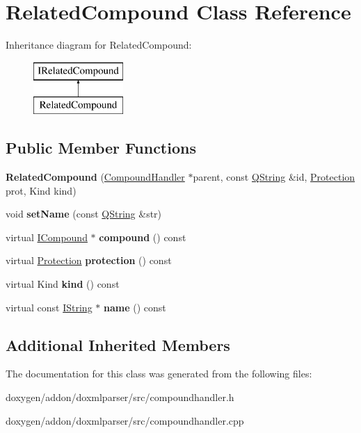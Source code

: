 \hypertarget{class_related_compound}{}\section{Related\+Compound Class Reference}
\label{class_related_compound}
Inheritance diagram for Related\+Compound\+:\begin{figure}[H]
\begin{center}
\leavevmode
\includegraphics[height=2.000000cm]{class_related_compound}
\end{center}
\end{figure}
\subsection*{Public Member Functions}
\begin{DoxyCompactItemize}
\item 
\mbox{\label{class_related_compound_a58f1b264c47bf2099fa167abede914d6}} 
{\bfseries Related\+Compound} (\mbox{\hyperlink{class_compound_handler}{Compound\+Handler}} $\ast$parent, const \mbox{\hyperlink{class_q_string}{Q\+String}} \&id, \mbox{\hyperlink{types_8h_a90e352184df58cd09455fe9996cd4ded}{Protection}} prot, Kind kind)
\item 
\mbox{\label{class_related_compound_a0eff6a37dfd17a90922930df2947ba60}} 
void {\bfseries set\+Name} (const \mbox{\hyperlink{class_q_string}{Q\+String}} \&str)
\item 
\mbox{\label{class_related_compound_a6c20fb5ece164126bf39dd997c276fee}} 
virtual \mbox{\hyperlink{class_i_compound}{I\+Compound}} $\ast$ {\bfseries compound} () const
\item 
\mbox{\label{class_related_compound_a9eca75df8dd9c73d37fc59045a140406}} 
virtual \mbox{\hyperlink{types_8h_a90e352184df58cd09455fe9996cd4ded}{Protection}} {\bfseries protection} () const
\item 
\mbox{\label{class_related_compound_ad3e03561d83b14147e4b1a6a22b22369}} 
virtual Kind {\bfseries kind} () const
\item 
\mbox{\label{class_related_compound_a547ea9a00f8ad927691f317d694cda62}} 
virtual const \mbox{\hyperlink{class_i_string}{I\+String}} $\ast$ {\bfseries name} () const
\end{DoxyCompactItemize}
\subsection*{Additional Inherited Members}


The documentation for this class was generated from the following files\+:\begin{DoxyCompactItemize}
\item 
doxygen/addon/doxmlparser/src/compoundhandler.\+h\item 
doxygen/addon/doxmlparser/src/compoundhandler.\+cpp\end{DoxyCompactItemize}
